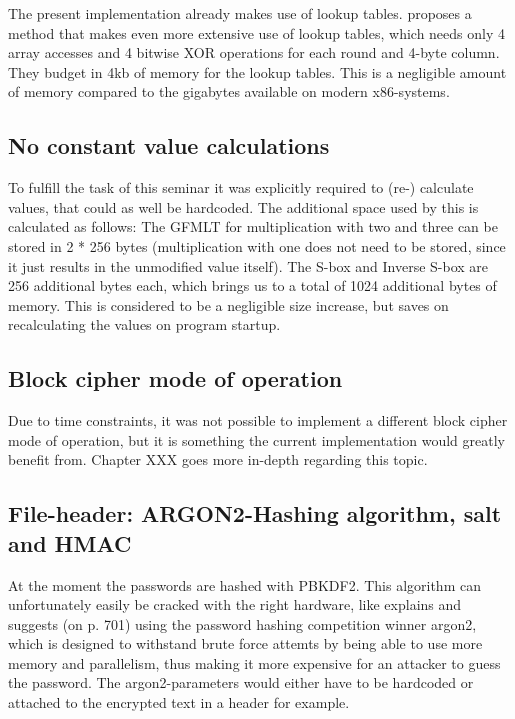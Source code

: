 The present implementation already makes use of lookup tables. \cite[p. 59]{rijndael} proposes a method that makes even more extensive use of lookup
tables, which needs only 4 array accesses and 4 bitwise XOR operations
for each round and 4-byte column. They budget in 4kb of memory for the
lookup tables. This is a negligible amount of memory compared to the
gigabytes available on modern x86-systems.

\hypertarget{no-constant-value-calculations}{%
\subsection{No constant value
calculations}\label{no-constant-value-calculations}}

To fulfill the task of this seminar it was explicitly required to (re-)
calculate values, that could as well be hardcoded. The additional space
used by this is calculated as follows: The GFMLT for multiplication with
two and three can be stored in 2 * 256 bytes (multiplication with one
does not need to be stored, since it just results in the unmodified
value itself). The S-box and Inverse S-box are 256 additional bytes
each, which brings us to a total of 1024 additional bytes of memory.
This is considered to be a negligible size increase, but saves on
recalculating the values on program startup.

\hypertarget{block-cipher-mode-of-operation}{%
\subsection{Block cipher mode of
operation}\label{block-cipher-mode-of-operation}}

Due to time constraints, it was not possible to implement a different
block cipher mode of operation, but it is something the current
implementation would greatly benefit from. Chapter XXX goes more
in-depth regarding this topic.

\hypertarget{file-header-argon2-hashing-algorithm-salt-and-hmac}{%
\subsection{File-header: ARGON2-Hashing algorithm, salt and
HMAC}\label{file-header-argon2-hashing-algorithm-salt-and-hmac}}

At the moment the passwords are hashed with PBKDF2. This algorithm can
unfortunately easily be cracked with the right hardware, like \cite[p. 697]{appcrypt} explains and suggests (on p. 701) using the password hashing
competition winner argon2, which is designed to withstand brute force
attemts by being able to use more memory and parallelism, thus making it
more expensive for an attacker to guess the password. The
argon2-parameters would either have to be hardcoded or attached to the
encrypted text in a header for example.

